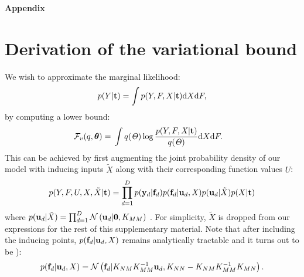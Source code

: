 \newpage
 \begin{center}
 \begin{Large}
 \textbf{
 Appendix
 } \\
 \end{Large}
 \end{center}
\appendix
\section{Derivation of the variational bound}

We wish to approximate the marginal likelihood:
\begin{equation}
\label{marginalLikelihoodSuppl}
p(Y | \mathbf{t}) =  \int p( Y , F, X| \mathbf{t}) \text{d}  X \text{d} F,
\end{equation}
by computing a lower bound:
\begin{align}
\mathcal{F}_v(q, \boldsymbol \theta) = {}& \int q(\mathit{\Theta}) \log 
		\frac{ p(Y , F , \mathit{X} | \mathbf{t})}
			 {q(\mathit{\Theta})}  \text{d}  X \text{d} F.
		 \label{jensens1Suppl}
\end{align}
%
This can be achieved by first augmenting the joint probability density of our model with inducing inputs $\tilde{X}$ along with their corresponding function values $U$:
\begin{equation}
 \label{augmentedJointSuppl}
p(Y,F, U,X,\tilde{X} | \mathbf{t}) = \prod_{d=1}^D p(\mathbf{y}_d | \mathbf{f}_d) p(\mathbf{f}_d | \mathbf{u}_d, \mathit{X})
p(\mathbf{u}_d | \tilde{X})  p(X | \mathbf{t})
\end{equation}
where $p(\mathbf{u}_d | \tilde{X}) = \prod_{d=1}^D \mathcal{N} \left( \mathbf{u}_d | \mathbf{0}, K_{MM} \right)$ . For simplicity, $\tilde{X}$ is dropped from our
expressions for the rest of this supplementary material. Note that after including the inducing points, $p(\mathbf{f}_d | \mathbf{u}_d, X)$
remains analytically tractable and it turns out to be \cite{rasmussen-williams}):
\begin{equation}
 \label{priorF2Suppl}
p(\mathbf{f}_d | \mathbf{u}_d, X) =  \mathcal{N}  \left( \mathbf{f}_d | K_{NM} K_{MM}^{-1} \mathbf{u}_d , K_{NN} - K_{NM} K_{MM}^{-1} K_{MN} \right).
\end{equation}
